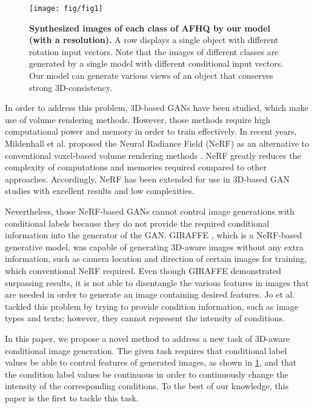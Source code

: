 \documentclass[nohyperref]{article}
\theoremstyle{plain}
\theoremstyle{definition}
\theoremstyle{remark}
\begin{document}
\begin{figure}[t]
\begin{center}
\centerline{\texttt{[image: fig/fig1]}}
\caption{\textbf{Synthesized images of each class of AFHQ by our model (with a  resolution).} A row displays a single object with different rotation input vectors. Note that the images of different classes are generated by a single model with different conditional input vectors. Our model can generate various views of an object that conserves strong 3D-consistency.}
\label{figure_1}
\end{center}
\vskip -0.2in
\end{figure}



In order to address this problem, 3D-based GANs \cite{wu2016learning, nguyen2019hologan, nguyen2020blockgan} have been studied, which make use of volume rendering methods. However, those methods require high computational power and memory in order to train effectively. In recent years, Mildenhall et al.  proposed the Neural Radiance Field (NeRF) as an alternative to conventional voxel-based volume rendering methods \cite{kajiya1984ray, drebin1988volume, henzler2019escaping}. NeRF greatly reduces the complexity of computations and memories required compared to other approaches. Accordingly, NeRF has been extended for use in 3D-based GAN studies \cite{schwarz2020graf, niemeyer2021giraffe, chan2021pi, deng2022gram} with excellent results and low complexities. 


Nevertheless, those NeRF-based GANs cannot control image generations with conditional labels because they do not provide the required conditional information into the generator of the GAN. GIRAFFE \cite{niemeyer2021giraffe}, which is a NeRF-based generative model, was capable of generating 3D-aware images without any extra information, such as camera location and direction of certain images for training, which conventional NeRF required. Even though GIRAFFE demonstrated surpassing results, it is not able to disentangle the various features \cite{bengio2013representation, locatello2019challenging, nguyen2020blockgan} in images that are needed in order to generate an image containing desired features. Jo et al.  tackled this problem by trying to provide condition information, such as image types and texts; however, they cannot represent the intensity of conditions. 

In this paper, we propose a novel method to address a new task of 3D-aware conditional image generation. The given task requires that conditional label values \cite{cgan, odena2017conditional, cgan_proj} be able to control features of generated images, as shown in \cref{figure_1}, and that the condition label values be continuous in order to continuously change the intensity of the corresponding conditions. To the best of our knowledge, this paper is the ﬁrst to tackle this task. 
\end{document}
